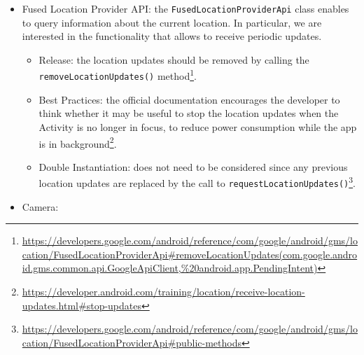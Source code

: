 \documentclass[11pt,a4paper,notitlepage]{article}
\begin{document}
\begin{itemize}
	\begin{itemize}
		\item Release: the API Client should always be disconnected when the application is done using it. This fact is not clearly stated in the documentation, but, given the best practices described in the next element, it is safe to assume that it is required.
		\item Best Practices: the official recommendation is to connect during \texttt{onStart()} and to disconnect during \texttt{onStop()}\footnote{\url{https://developers.google.com/android/guides/api-client\#start_a_manually_managed_connection}}.
		\item Double Instantiation: it is not a problem since the call to \texttt{connect()} returns immediately if the client is already connected or connecting\footnote{\url{https://developers.google.com/android/reference/com/google/android/gms/common/api/GoogleApiClient\#public-methods}}.
	\end{itemize}
	\item Fused Location Provider API: the \texttt{FusedLocationProviderApi} class enables to query information about the current location. In particular, we are interested in the functionality that allows to receive periodic updates.
	\begin{itemize}
		\item Release: the location updates should be removed by calling the \texttt{removeLocationUpdates()} method\footnote{\url{https://developers.google.com/android/reference/com/google/android/gms/location/FusedLocationProviderApi\#removeLocationUpdates(com.google.android.gms.common.api.GoogleApiClient,\%20android.app.PendingIntent)}}.
		\item Best Practices: the official documentation encourages the developer to think whether it may be useful to stop the location updates when the Activity is no longer in focus, to reduce power consumption while the app is in background\footnote{\url{https://developer.android.com/training/location/receive-location-updates.html\#stop-updates}}.
		\item Double Instantiation: does not need to be considered since any previous location updates are replaced by the call to \texttt{requestLocationUpdates()}\footnote{\url{https://developers.google.com/android/reference/com/google/android/gms/location/FusedLocationProviderApi\#public-methods}}.
	\end{itemize}
	\item Camera:
		\begin{itemize}

\end{itemize}
\end{itemize}
\end{document}
